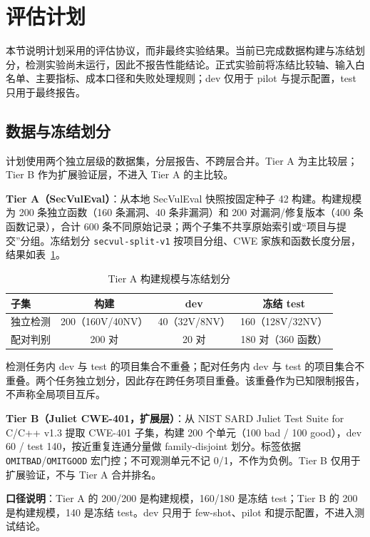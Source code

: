 \documentclass[conference]{IEEEtran}
\begin{document}
\section{评估计划}
\label{sec:eval-plan}

本节说明计划采用的评估协议，而非最终实验结果。当前已完成数据构建与冻结划分，检测实验尚未运行，因此不报告性能结论。正式实验前将冻结比较轴、输入白名单、主要指标、成本口径和失败处理规则；dev 仅用于 pilot 与提示配置，test 只用于最终报告。

\subsection{数据与冻结划分}
\label{sec:eval-data}

计划使用两个独立层级的数据集，分层报告、不跨层合并。Tier A 为主比较层；Tier B 作为扩展验证层，不进入 Tier A 的主比较。

\textbf{Tier A（SecVulEval）}：从本地 SecVulEval 快照按固定种子 42 构建。构建规模为 200 条独立函数（160 条漏洞、40 条非漏洞）和 200 对漏洞/修复版本（400 条函数记录），合计 600 条不同原始记录；两个子集不共享原始索引或“项目与提交”分组。冻结划分 \texttt{secvul-split-v1} 按项目分组、CWE 家族和函数长度分层，结果如表~\ref{tab:eval-split}。

\begin{table}[t]
\caption{Tier A 构建规模与冻结划分}
\label{tab:eval-split}
\centering
\small
\setlength{\tabcolsep}{2pt}
\begin{tabular}{@{}lccc@{}}
\toprule
子集 & 构建 & dev & 冻结 test\\
\midrule
独立检测 & 200（160V/40NV） & 40（32V/8NV） & 160（128V/32NV）\\
配对判别 & 200 对 & 20 对 & 180 对（360 函数）\\
\bottomrule
\end{tabular}
\end{table}

检测任务内 dev 与 test 的项目集合不重叠；配对任务内 dev 与 test 的项目集合不重叠。两个任务独立划分，因此存在跨任务项目重叠。该重叠作为已知限制报告，不声称全局项目互斥。

\textbf{Tier B（Juliet CWE-401，扩展层）}：从 NIST SARD Juliet Test Suite for C/C++ v1.3 提取 CWE-401 子集，构建 200 个单元（100 bad / 100 good），dev 60 / test 140，按近重复连通分量做 family-disjoint 划分。标签依据 \texttt{OMITBAD}/\texttt{OMITGOOD} 宏门控；不可观测单元不记 0/1，不作为负例。Tier B 仅用于扩展验证，不与 Tier A 合并排名。

\textbf{口径说明}：Tier A 的 200/200 是构建规模，160/180 是冻结 test；Tier B 的 200 是构建规模，140 是冻结 test。dev 只用于 few-shot、pilot 和提示配置，不进入测试结论。
\end{document}
